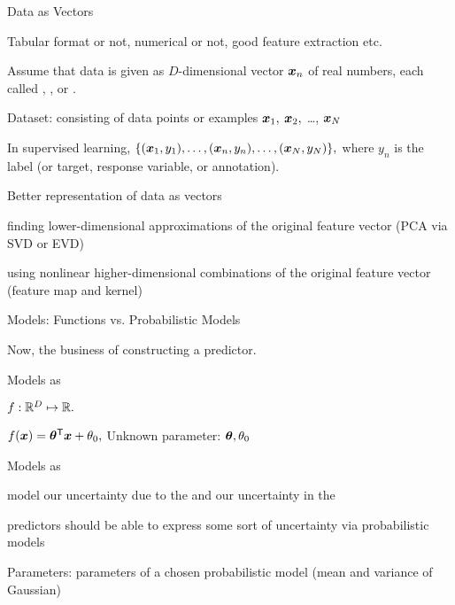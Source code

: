 \documentclass[handout,fleqn,aspectratio=169]{beamer}
\begin{document}
\begin{frame}{Data as Vectors}

\plitemsep 0.1in

\bci 

\item Tabular format or not, numerical or not, good feature extraction etc. 

\item Assume that data is given as $D$-dimensional vector $\bm{x}_n$ of real numbers, each called , , or .

\item Dataset: consisting of data points or examples $\bm{x}_1,$ $\bm{x}_2,$ \ldots, $\bm{x}_N$
\item In supervised learning, $\{(\bm{x}_1, y_1), \ldots, (\bm{x}_n,y_n), \ldots, (\bm{x}_N,y_N) \},$ where $y_n$ is the label (or target, response variable, or annotation). 
\item Better representation of data as vectors
\bci
\item finding lower-dimensional approximations of the original feature vector (PCA via SVD or EVD)
\item using nonlinear higher-dimensional combinations of the original feature vector (feature map and kernel)
\eci
\eci
\end{frame}

\begin{frame}{Models: Functions vs. Probabilistic Models}

{
\plitemsep 0.07in

\bci 

\item Now, the business of constructing a predictor. 

\item Models as 
\bci
\item $f: {\mathbb R}^{D} \mapsto {\mathbb R}.$ 
\item \exam $f(\bm{x}) = {\bm{\theta}}^{\mathsf{T}}\bm{x} + \theta_0,$ Unknown parameter: $\bm{\theta},\theta_0$

\eci

\item Models as 

\bci
\item model our uncertainty due to the  and our uncertainty in the 

\item predictors should be able to express some sort of uncertainty via probabilistic models
\item Parameters: parameters of a chosen probabilistic model (mean and variance of Gaussian)
\eci

\eci

}
{
\vspace{-0.3cm}

}

\end{frame}
\end{document}
